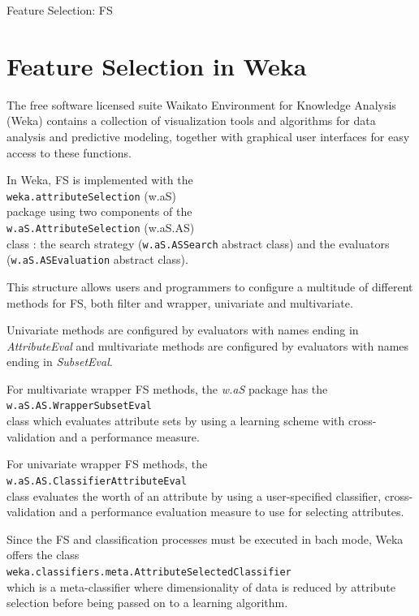 \documentclass[journal,twoside,web]{ieeecolor}
\newcommand{\code}[1]{\colorbox{light-gray}{\texttt{#1}}}
\begin{document}
Feature Selection: FS


\section{Feature Selection in Weka}

The free software licensed suite Waikato Environment for Knowledge Analysis (Weka) \cite{Weka} contains a collection of visualization tools and algorithms for data analysis and predictive modeling, together with graphical user interfaces for easy access to these functions.


In Weka, FS is implemented with the \\ \code{weka.attributeSelection} (w.aS) \\ package using two components of the \\\code{w.aS.AttributeSelection} (w.aS.AS) \\ class : the search strategy (\code{w.aS.ASSearch} abstract class) and the evaluators (\code{w.aS.ASEvaluation} abstract class). 


This structure allows users and programmers to configure a multitude of different methods for FS, both filter and wrapper, univariate and multivariate. 

Univariate methods are configured by evaluators with names ending in \textit{AttributeEval} and multivariate methods are configured by evaluators with names ending in \textit{SubsetEval}.

For multivariate wrapper FS methods, the \textit{w.aS} package has the \\ \code{w.aS.AS.WrapperSubsetEval} \\ class which evaluates attribute sets by using a learning scheme with  cross-validation and a performance measure. 

For univariate wrapper FS methods, the \\ \code{w.aS.AS.Classi\-fierAttributeEval} \\ class evaluates the worth of an attribute by using a user-specified classifier, cross-validation and a performance evaluation measure to use for selecting attributes. 

Since the FS and classification processes must be executed in bach mode, Weka offers the class
\\ \scriptsize \code{weka.classifiers.meta.AttributeSelected\-Classifier} \normalsize 
\\ which is a meta-classifier where dimensionality of data is reduced by attribute selection before being passed on to a learning algorithm.
\end{document}
